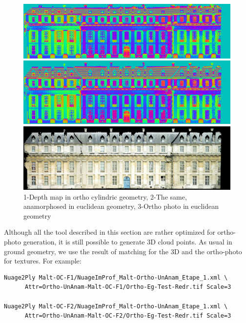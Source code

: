 \begin{figure}
\begin{center}
\includegraphics[width=160mm]{FIGS/Vincennes/MNE-OC.jpg}

\vspace{0.3cm}
\includegraphics[width=160mm]{FIGS/Vincennes/MEN-Eucl.jpg}

\vspace{0.3cm}
\includegraphics[width=160mm]{FIGS/Vincennes/Ortho-Eg-Test-Redr.jpg}

\end{center}
\caption{1-Depth map in ortho cylindric geometry, 2-The same, anamorphosed in euclidean
geometry, 3-Ortho photo in euclidean geometry}
\label{FIG:OK:Vincenne}
\end{figure}


Although all the tool described in this section are rather optimized 
for ortho-photo generation, it is still possible to generate 3D cloud points.
As usual in ground geometry, we use the result of matching for the 3D and
the ortho-photo for textures.
For example:


\begin{verbatim}
Nuage2Ply Malt-OC-F1/NuageImProf_Malt-Ortho-UnAnam_Etape_1.xml \
      Attr=Ortho-UnAnam-Malt-OC-F1/Ortho-Eg-Test-Redr.tif Scale=3

Nuage2Ply Malt-OC-F2/NuageImProf_Malt-Ortho-UnAnam_Etape_1.xml \
      Attr=Ortho-UnAnam-Malt-OC-F2/Ortho-Eg-Test-Redr.tif Scale=3
\end{verbatim}

